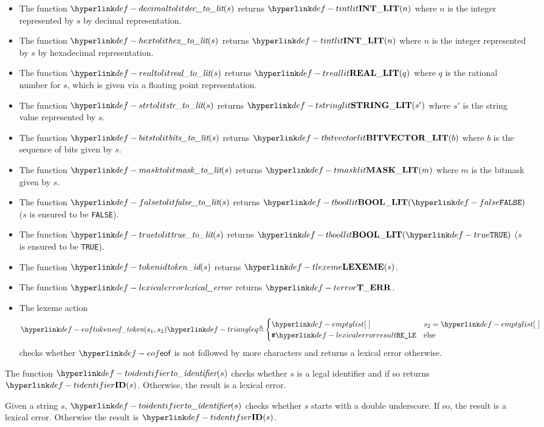 \begin{itemize}
\hypertarget{def-decimaltolit}{}
\item The function $\decimaltolit(s)$ returns $\Tintlit(n)$ where $n$ is the integer represented by $s$
by decimal representation.
\hypertarget{def-hextolit}{}
\item The function $\hextolit(s)$ returns $\Tintlit(n)$ where $n$ is the integer represented by $s$
by hexadecimal representation.
\hypertarget{def-realtolit}{}
\item The function $\realtolit(s)$ returns $\Treallit(q)$ where $q$ is the rational number for
$s$, which is given via a floating point representation.
\hypertarget{def-strtolit}{}
\item The function $\strtolit(s)$ returns $\Tstringlit(s')$ where $s'$ is the string value represented by $s$.
\hypertarget{def-bitstolit}{}
\item The function $\bitstolit(s)$ returns $\Tbitvectorlit(b)$ where $b$ is the sequence of bits
given by $s$.
\hypertarget{def-masktolit}{}
\item The function $\masktolit(s)$ returns $\Tmasklit(m)$ where $m$ is the bitmask given by $s$.
\hypertarget{def-falsetolit}{}
\item The function $\falsetolit(s)$ returns $\Tboollit(\False)$ ($s$ is ensured to be \texttt{FALSE}).
\hypertarget{def-truetolit}{}
\item The function $\truetolit(s)$ returns $\Tboollit(\True)$ ($s$ is ensured to be \texttt{TRUE}).
\hypertarget{def-tokenid}{}
\item The function $\tokenid(s)$ returns $\Tlexeme(s)$.
\hypertarget{def-lexicalerror}{}
\item The function $\lexicalerror$ returns $\Terror$.
\hypertarget{def-eoftoken}{}
\item The lexeme action
\[
\eoftoken(s_1, s_2) \triangleq \begin{cases}
  \emptylist & s_2 = \emptylist\\
  \LexicalErrorConfig & \text{else}
\end{cases}
\]
checks whether $\eof$ is not followed by more characters and returns a lexical error otherwise.
\end{itemize}

\hypertarget{def-toidentifier}{}
The function $\toidentifier(s)$ checks whether $s$ is a legal identifier
and if so returns $\Tidentifier(s)$. Otherwise, the result is a lexical error.

\ProseParagraph
Given a string $s$, $\toidentifier(s)$ checks whether $s$ starts with a double
underscore. If so, the result is a lexical error. Otherwise the result is
$\Tidentifier(s)$.

